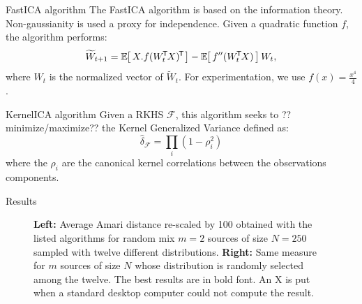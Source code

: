 \documentclass{beamer}
\begin{document}
\begin{frame}{}
\begin{columns}[T]
\begin{column}{.48\linewidth}

\begin{block}{FastICA algorithm}
The FastICA algorithm is based on the information theory. Non-gaussianity is used a proxy for independence. Given a quadratic function $f$, the algorithm performs:
\begin{equation}
  \widetilde W_{t+1} = \zesp{X.\ztr{f(\ztr{W_t}X)}} - \zesp{f''(\ztr{W_t}X)}W_t,
\end{equation}
where $W_t$ is the normalized vector of $\widetilde W_t$. For experimentation, we use $f(x) = \frac{x^4}4$.
\end{block}


\begin{block}{KernelICA algorithm}
Given a RKHS $\mathcal{F}$, this algorithm seeks to ??minimize/maximize?? the Kernel Generalized Variance defined as:
\begin{equation}
\widehat{\delta}_{\mathcal{F}}=\underset{i}{\prod}(1-\rho_i^2)
\end{equation}
where the $\rho_i$ are the canonical kernel correlations between the observations components.
\end{block}


%
%


\begin{block}{Results}

\begin{figure}
\label{distres}
\centering
\resizebox{\textwidth}{!}{

}
\caption{\textbf{Left:} Average Amari distance re-scaled by 100 obtained with the listed algorithms for random mix $m=2$ sources of size $N=250$ sampled with twelve different distributions. \textbf{Right:} Same measure for $m$ sources of size $N$ whose distribution is randomly selected among the twelve. The best results are in bold font. An X is put when a standard desktop computer could not compute the result.}
\end{figure}


\end{block}
\end{column}
\end{columns}
\end{frame}
\end{document}
